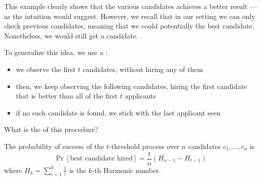 \documentclass[a4paper, 12pt]{report}
\begin{document}
    This example clearly shows that  the various candidates achieves a better result --- as the intuition would suggest. However, we recall that in our setting we can only check previous candidates, meaning that we could potentially  the best candidate. Nonetheless, we would still get a  candidate.

    To generalize this idea, we use a :

    \begin{itemize}
        \item we observe the first $t$ candidates, without hiring any of them
        \item then, we keep observing the following candidates, hiring the first candidate that is better than all of the first $t$ applicants
        \item if no such candidate is found, we stick with the last applicant seen
    \end{itemize}

    What is the  of this procedure?

    \begin{framedlem}{}
        The probability of success of the $t$-threshold process over $n$ candidates $c_1, \ldots, c_n$ is $$\Pr[\mbox{best candidate hired}] = \dfrac{t}{n}(H_{n - 1} - H_{t - 1})$$ where $H_k = \sum_{i = 1}^k{\tfrac{1}{i}}$ is the $k$-th Harmonic number.
    \end{framedlem}
\end{document}
